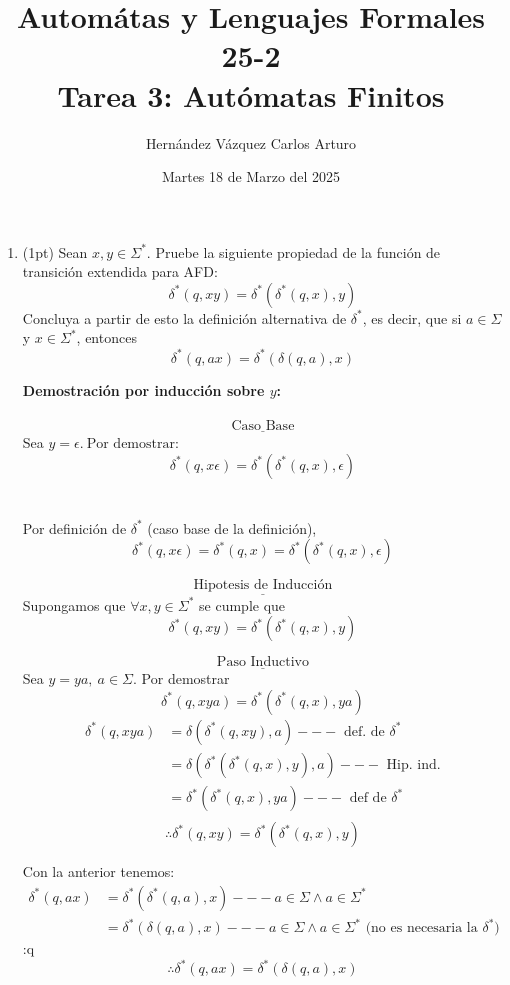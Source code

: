 \documentclass{article}
\title{Automátas y Lenguajes Formales 25-2 \\ Tarea 3: Autómatas Finitos}
\author{Hernández Vázquez Carlos Arturo }
\date{Martes 18 de Marzo del 2025}
\begin{document}
\maketitle

\begin{enumerate}
    \item (1pt) Sean $x,y \in \Sigma ^*$. Pruebe la siguiente propiedad de la función de transición extendida para AFD:
    $$\delta^*(q,xy) = \delta^*(\delta^*(q,x),y)$$
    Concluya a partir de esto la definición alternativa de $\delta^*$, es decir, que si $a \in \Sigma$ y $x \in \Sigma^*$, entonces $$\delta^*(q,ax) = \delta^*(\delta(q,a),x)$$

    \textbf{Demostración por inducción sobre $y$:} \\ \\
    $$\underline{\text{Caso Base}}$$ Sea $y = \epsilon.~ \text{Por demostrar: }$
    $$\delta^*(q,x\epsilon) = \delta^*(\delta^*(q,x),\epsilon)$$\\ \\
    Por definición de $\delta^*$ (caso base de la definición), $$\delta^*(q,x \epsilon) = \delta^*(q,x) =\delta^*(\delta^*(q,x),\epsilon)$$

    $$\underline{\text{Hipotesis de Inducción}}$$ Supongamos que $\forall x,y \in \Sigma^*$ se cumple que $$\delta^* (q,xy) = \delta^*(\delta^*(q,x),y)$$
    
    $$\underline{\text{Paso Inductivo}}$$ Sea $ y = ya,~a \in \Sigma.$ Por demostrar
    $$\delta^* (q,xya) = \delta^*(\delta^*(q,x),ya)$$
    \begin{align*}
    \delta^*(q,xya) &= \delta (\delta^*(q,xy),a) --- \text{ def. de } \delta^* \\
      &= \delta (\delta^*(\delta^*(q,x),y),a) --- \text{ Hip. ind.} \\
      &= \delta^*(\delta^*(q,x),ya) --- \text{ def de } \delta^* \\
    \end{align*}
    $$\boxed{\therefore \delta^*(q,xy) = \delta^*(\delta^*(q,x),y)}$$

    Con la anterior tenemos:
    \begin{align*}
    \delta^*(q,ax) &= \delta^*(\delta^*(q,a),x) --- a \in \Sigma \land a \in \Sigma^* \\
      &= \delta^*(\delta(q,a),x) --- a \in \Sigma \land a \in \Sigma^* \text{ (no es necesaria la } \delta^*)
    \end{align*}:q
    $$\boxed{\therefore \delta^*(q,ax) = \delta^*(\delta(q,a),x)}$$
    

\end{enumerate}
\end{document}
